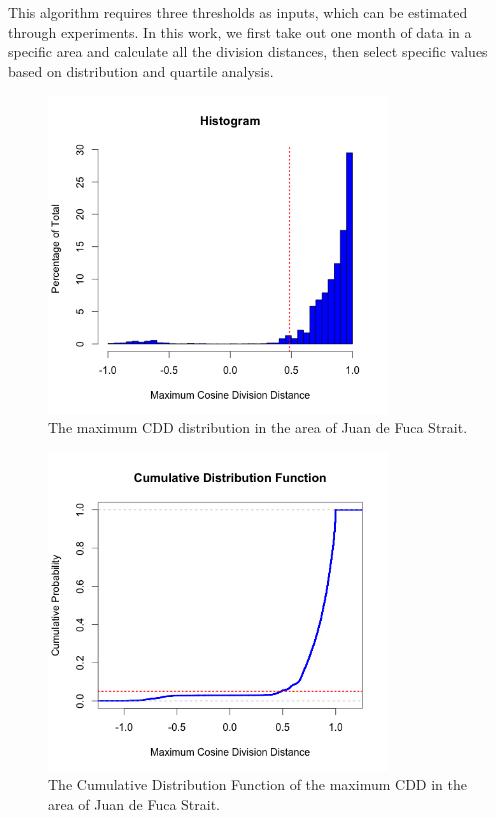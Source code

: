 \documentclass[12pt,glossary]{dalcsthesis}
\begin{document}
This algorithm requires three thresholds as inputs, which can be estimated through experiments. In this work, we first take out one month of data in a specific area and calculate all the division distances, then select specific values based on distribution and quartile analysis. 

\begin{figure}[!hp]
\centering
\includegraphics[width=9cm]{hist.png}
\caption{The maximum CDD distribution in the area of Juan de Fuca Strait.}
\label{fig:maxiCDD}
\end{figure}

\begin{figure}[!hp]
\centering
\includegraphics[width=9cm]{cdf.png}
\caption{The Cumulative Distribution Function of the maximum CDD in the area of Juan de Fuca Strait.}
\label{fig:cdf}
\end{figure}
\end{document}
